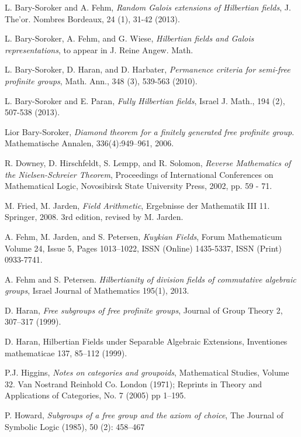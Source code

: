 \documentclass[12pt,a4paper]{article}
\begin{document}
\begin{thebibliography}{60}

 L. Bary-Soroker and A. Fehm, \emph{Random Galois extensions of Hilbertian fields}, J. The'or. Nombres Bordeaux, 24 (1), 31-42 (2013).

  L. Bary-Soroker, A. Fehm, and G. Wiese, \emph{Hilbertian fields and Galois representations}, to appear in J. Reine Angew. Math.

 L. Bary-Soroker, D. Haran, and D. Harbater, \emph{Permanence criteria for semi-free profinite groups}, Math. Ann., 348 (3), 539-563 (2010).

 L. Bary-Soroker and E. Paran, \emph{Fully Hilbertian fields}, Israel J. Math., 194 (2), 507-538 (2013). 

 Lior Bary-Soroker, \emph{Diamond theorem for a finitely generated free profinite group}. Mathematische Annalen, 336(4):949–961, 2006.

 R. Downey, D. Hirschfeldt, S. Lempp, and R. Solomon, \emph{Reverse Mathematics of the Nielsen-Schreier Theorem}, Proceedings of International Conferences on Mathematical Logic, Novosibirsk State University Press, 2002, pp. 59 - 71. 

 M. Fried, M. Jarden, \emph{Field Arithmetic}, Ergebnisse der Mathematik
III 11. Springer, 2008. 3rd edition, revised by M. Jarden.

 A. Fehm, M. Jarden, and S. Petersen, \emph{Kuykian Fields}, Forum Mathematicum Volume 24, Issue 5, Pages 1013–1022, ISSN (Online) 1435-5337, ISSN (Print) 0933-7741.

 A. Fehm and S. Petersen. \emph{Hilbertianity of division fields of commutative algebraic groups}, Israel Journal of Mathematics 195(1), 2013. 

 D. Haran, \emph{Free subgroups of free profinite groups},
Journal of Group Theory 2, 307–317 (1999).

 D. Haran, Hilbertian Fields under Separable Algebraic Extensions,
Inventiones mathematicae 137, 85–112 (1999). 

 P.J. Higgins, \emph{Notes on categories and groupoids}, Mathematical Studies, Volume 32. Van Nostrand Reinhold Co. London (1971); Reprints in Theory and Applications of Categories, No. 7 (2005) pp 1--195.

 P. Howard,  \emph{Subgroups of a free group and the axiom of choice}, The Journal of Symbolic Logic (1985), 50 (2): 458–467


\end{thebibliography}
\end{document}
